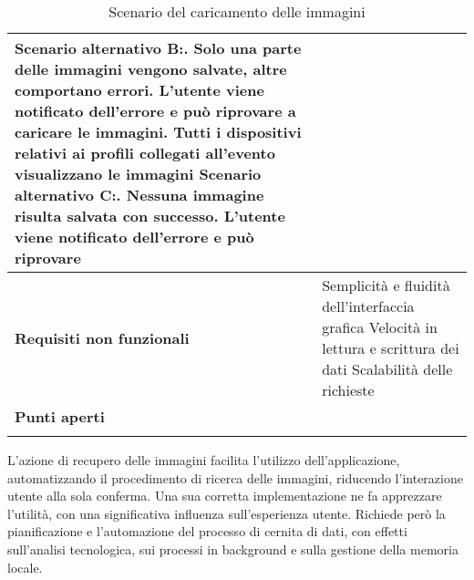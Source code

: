 \begin{longtable} {|P{4.5cm}|P{11cm}|}
    Scenario alternativo B:. Solo una parte delle immagini vengono salvate, altre comportano errori. L'utente viene notificato dell'errore e può riprovare a caricare le immagini. Tutti i dispositivi relativi ai profili collegati all'evento visualizzano le immagini\newline
    Scenario alternativo C:. Nessuna immagine risulta salvata con successo. L'utente viene notificato dell'errore e può riprovare                                                            \\
    \hline
    \textbf{Requisiti non funzionali} & Semplicità e fluidità dell'interfaccia grafica   \newline
    Velocità in lettura e scrittura dei dati\newline
    Scalabilità delle richieste                                                                                         \\
    \hline
    \textbf{Punti aperti}             &                                                                                 \\
    \hline

    \caption{Scenario del caricamento delle immagini}
\end{longtable}

L'azione di recupero delle immagini facilita l'utilizzo dell'applicazione,
automatizzando il procedimento di ricerca delle immagini,
riducendo l'interazione utente alla sola conferma.
Una sua corretta implementazione ne fa apprezzare l'utilità,
con una significativa influenza sull'esperienza utente.
Richiede però la pianificazione e l'automazione del processo di cernita di dati,
con effetti sull'analisi tecnologica, sui processi in background e sulla gestione della memoria locale.\\

